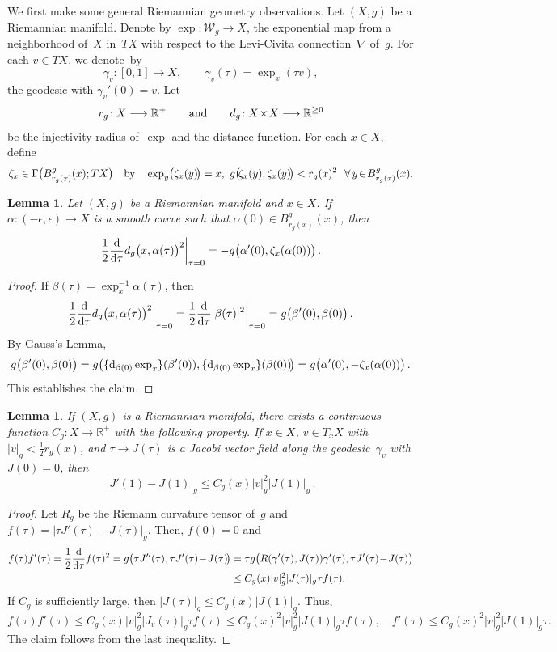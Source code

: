 \documentclass[11pt]{article}
\numberwithin{equation}{section}
\newtheorem{lmm}[thm]{Lemma}
\theoremstyle{definition}
\def\lra{\longrightarrow}
\def\R{\mathbb R}
\def\cW{\mathcal W}
\def\al{\alpha}
\def\be{\beta}
\def\ga{\gamma}
\def\ep{\epsilon}
\def\na{\nabla}
\def\ze{\zeta}
\def\Ga{\Gamma}
\def\nd{\textnormal{d}}
\begin{document}
\noindent
We first make some general Riemannian geometry observations.
Let $(X,g)$ be a Riemannian manifold. Denote by $\exp\!:\cW_g\!\lra\!X$,
the exponential map from a neighborhood of~$X$ in~$TX$ with respect to
the Levi-Civita connection~$\na$ of~$g$.
For each $v\!\in\!TX$, we denote~by
$$\ga_v\!:[0,1]\lra X, \qquad \ga_v(\tau)=\exp_x(\tau v),$$  
the geodesic with $\ga_v'(0)\!=\!v$.
Let
$$r_g\!:X\lra\R^+ \qquad\hbox{and}\qquad d_g\!:X\!\times\!X\lra\R^{\ge0}$$
be the injectivity radius of~$\exp$ and the distance function.
For each $x\!\in\!X$, define
$$\ze_x\in\Ga\big(B_{r_g(x)}^g(x);TX\big) \quad\hbox{by}\quad
\exp_y\!\big(\ze_x(y)\!\big)=x, ~g\big(\!\ze_x(y),\ze_x(y)\!\big)<r_g(x)^2
~~\forall\,y\!\in\!B_{r_g(x)}^g(x).$$
 
\begin{lmm}\label{distder_lmm}
Let $(X,g)$ be a Riemannian manifold and $x\!\in\!X$.
If  $\al\!:(-\ep,\ep)\!\lra\!X$ is a smooth curve such that 
$\al(0)\!\in\!B_{r_g(x)}^g(x)$, 
then 
$$\frac12\frac{\nd}{\nd\tau}d_g\big(x,\al(\tau)\big)^2\bigg|_{\tau=0}
=-g\big(\al'(0),\ze_x(\al(0))\big)\,.$$
\end{lmm}

\begin{proof}
If $\be(\tau)\!=\!\exp_x^{-1}\al(\tau)$, then
$$\frac12\frac{\nd}{\nd\tau}d_g\big(x,\al(\tau)\big)^2\bigg|_{\tau=0}
=\frac12\frac{\nd}{\nd\tau}|\be(\tau)|^2\bigg|_{\tau=0}
=g\big(\be'(0),\be(0)\big)\,.$$
By Gauss's Lemma,
$$g\big(\be'(0),\be(0)\big)
=g\big(\{\nd_{\be(0)}\exp_x\}(\be'(0)),\{\nd_{\be(0)}\exp_x\}(\be(0))\!\big)
=g\big(\al'(0),-\ze_x(\al(0))\big)\,.$$
This establishes the claim.
\end{proof}


\begin{lmm}\label{JacDer_lmm}
If $(X,g)$ is a Riemannian manifold, there exists 
a continuous function \hbox{$C_g\!:X\!\lra\!\R^+$}
with the following property.
If $x\!\in\!X$, $v\!\in\!T_xX$ with $|v|_g\!<\!\frac12r_g(x)$, and 
$\tau\!\lra\!J(\tau)$ is a Jacobi vector field along the geodesic~$\ga_v$
with $J(0)\!=\!0$, then 
$$\big|J'(1)-J(1)\big|_g\le C_g(x)|v|_g^2\big|J(1)\big|_g\,.$$
\end{lmm}


\begin{proof}
Let $R_g$ be the Riemann curvature tensor of~$g$ and
$f(\tau)\!=\!|\tau J'(\tau)\!-\!J(\tau)|_g$.
Then, $f(0)\!=\!0$ and
\begin{equation*}\begin{split}
f(\tau)f'(\tau)=\frac12\frac{\nd}{\nd\tau}f(\tau)^2
=g\big(\tau J''(\tau),\tau J'(\tau)\!-\!J(\tau)\!\big)
&=\tau g\big(R(\ga'(\tau),J(\tau))\ga'(\tau),\tau J'(\tau)\!-\!J(\tau)\big)\\
&\le C_g(x)|v|_g^2|J(\tau)|_g\tau f(\tau).
\end{split}\end{equation*}
If $C_g$ is sufficiently large, then $|J(\tau)|_g\!\le\!C_g(x)|J(1)|_g$.
Thus, 
$$f(\tau)f'(\tau)\le C_g(x)|v|_g^2|J_v(\tau)|_g\tau f(\tau)
\le C_g(x)^2|v|_g^2|J(1)|_g\tau f(\tau), \quad
f'(\tau)\le C_g(x)^2|v|_g^2|J(1)|_g\tau.$$
The claim follows from the last inequality.
\end{proof}
\end{document}
